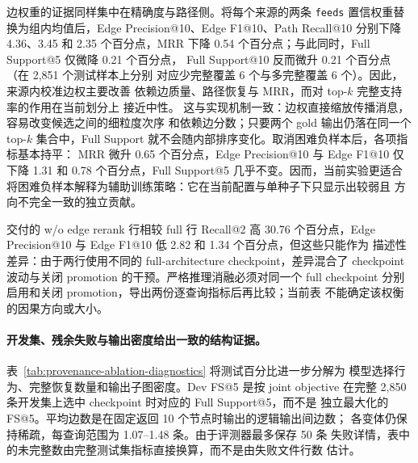 边权重的证据同样集中在精确度与路径侧。将每个来源的两条
\texttt{feeds} 置信权重替换为组内均值后，Edge Precision@10、Edge
F1@10、Path Recall@10 分别下降 4.36、3.45 和 2.35 个百分点，MRR
下降 0.54 个百分点；与此同时，Full Support@5 仅微降 0.21 个百分点，
Full Support@10 反而微升 0.21 个百分点（在 2,851 个测试样本上分别
对应少完整覆盖 6 个与多完整覆盖 6 个）。因此，来源内校准边权主要改善
依赖边质量、路径恢复与 MRR，而对 top-$k$ 完整支持率的作用在当前划分上
接近中性。
这与实现机制一致：边权直接缩放传播消息，容易改变候选之间的细粒度次序
和依赖边分数；只要两个 gold 输出仍落在同一个 top-$k$ 集合中，Full
Support 就不会随内部排序变化。取消困难负样本后，各项指标基本持平：
MRR 微升 0.65 个百分点，Edge Precision@10 与 Edge F1@10 仅下降
1.31 和 0.78 个百分点，Full Support@5 几乎不变。因而，当前实验更适合
将困难负样本解释为辅助训练策略：它在当前配置与单种子下只显示出较弱且
方向不完全一致的独立贡献。

交付的 w/o edge rerank 行相较 full 行 Recall@2 高 30.76 个百分点，Edge
Precision@10 与 Edge F1@10 低 2.82 和 1.34 个百分点，但这些只能作为
描述性差异：由于两行使用不同的 full-architecture checkpoint，差异混合了
checkpoint 波动与关闭 promotion 的干预。严格推理消融必须对同一个 full
checkpoint 分别启用和关闭 promotion，导出两份逐查询指标后再比较；当前表
不能确定该权衡的因果方向或大小。

\paragraph{开发集、残余失败与输出密度给出一致的结构证据。}
表~\ref{tab:provenance-ablation-diagnostics} 将测试百分比进一步分解为
模型选择行为、完整恢复数量和输出子图密度。Dev FS@5 是按 joint objective
在完整 2,850 条开发集上选中 checkpoint 时对应的 Full Support@5，而不是
独立最大化的 FS@5。平均边数是在固定返回 10 个节点时输出的逻辑输出间边数；
各变体仍保持稀疏，每查询范围为 1.07--1.48 条。由于评测器最多保存 50 条
失败详情，表中的未完整数由完整测试集指标直接换算，而不是由失败文件行数
估计。

